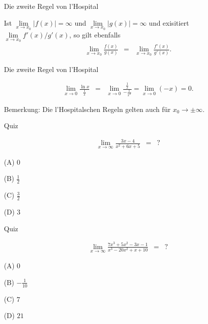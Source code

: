 \documentclass[german]{beamer}
\newcommand{\bq}{\begin{eqnarray*}}
\newcommand{\eq}{\end{eqnarray*}}
\begin{document}
\begin{frame}{Die zweite Regel von l'Hospital}

\begin{theorem}
Ist $\lim\limits_{x \rightarrow x_0} |f(x)| = \infty$ und $\lim\limits_{x \rightarrow x_0} |g(x)| = \infty$
und exisitiert
$\lim\limits_{x \rightarrow x_0} f'(x)/g'(x)$, so gilt ebenfalls
\bq
 \lim\limits_{x\rightarrow x_0} \frac{f(x)}{g(x)} & = & \lim\limits_{x\rightarrow x_0} \frac{f'(x)}{g'(x)}.
\eq
\end{theorem}

\end{frame}

\begin{frame}{Die zweite Regel von l'Hospital}

\begin{example}
\bq
 \lim\limits_{x\rightarrow 0} \frac{\ln x}{\frac{1}{x}}
 & = & 
 \lim\limits_{x\rightarrow 0} \frac{\frac{1}{x}}{-\frac{1}{x^2}}
 =
 \lim\limits_{x\rightarrow 0} \left( - x \right) = 0.
\eq
\end{example}

\vspace*{10mm}
Bemerkung: Die l'Hospitalschen Regeln gelten auch f\"ur $x_0 \rightarrow \pm \infty$.

\end{frame}

\begin{frame}{Quiz}

\bq
 \lim\limits_{x \rightarrow \infty} \frac{3x-4}{x^2+6x+5} 
 & = & ?
\eq
\begin{description}
\item{(A)} $0$
\item{(B)} $\frac{1}{2}$
\item{(C)} $\frac{3}{2}$
\item{(D)} $3$
\end{description}

\end{frame}

\begin{frame}{Quiz}

\bq
 \lim\limits_{x \rightarrow \infty} \frac{7x^3+5x^2-3x-1}{x^3-20x^2+x+10} 
 & = & ?
\eq
\begin{description}
\item{(A)} $0$
\item{(B)} $-\frac{1}{10}$
\item{(C)} $7$
\item{(D)} $21$
\end{description}

\end{frame}
\end{document}
